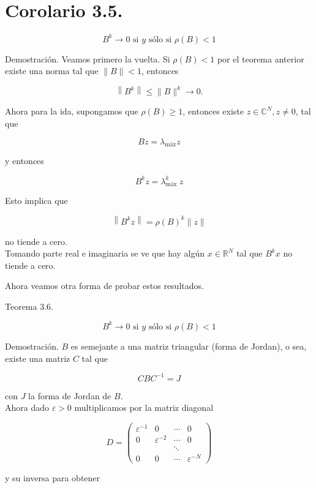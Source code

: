 \documentclass[10pt]{book}
\begin{document}
\section*{Corolario 3.5.}
$$
B^{k} \rightarrow 0 \text { si } y \text { sólo si } \rho(B)<1
$$

Demostración. Veamos primero la vuelta. Si $\rho(B)<1$ por el teorema anterior existe una norma tal que $\|B\|<1$, entonces

$$
\left\|B^{k}\right\| \leq\|B\|^{k} \rightarrow 0 .
$$

Ahora para la ida, supongamos que $\rho(B) \geq 1$, entonces existe $z \in \mathbb{C}^{N}, z \neq 0$, tal que

$$
B z=\lambda_{\operatorname{máx}} z
$$

y entonces

$$
B^{k} z=\lambda_{\text {máx }}^{k} z
$$

Esto implica que

$$
\left\|B^{k} z\right\|=\rho(B)^{k}\|z\|
$$

no tiende a cero.\\
Tomando parte real e imaginaria se ve que hay algún $x \in \mathbb{R}^{N}$ tal que $B^{k} x$ no tiende a cero.

Ahora veamos otra forma de probar estos resultados.

Teorema 3.6.

$$
B^{k} \rightarrow 0 \text { si } y \text { sólo si } \rho(B)<1
$$

Demostración. $B$ es semejante a una matriz triangular (forma de Jordan), o sea, existe una matriz $C$ tal que

$$
C B C^{-1}=J
$$

con $J$ la forma de Jordan de $B$.\\
Ahora dado $\varepsilon>0$ multiplicamos por la matriz diagonal

$$
D=\left(\begin{array}{cccc}
\varepsilon^{-1} & 0 & \cdots & 0 \\
0 & \varepsilon^{-2} & \cdots & 0 \\
& & \ddots & \\
0 & 0 & \cdots & \varepsilon^{-N}
\end{array}\right)
$$

y su inversa para obtener
\end{document}
